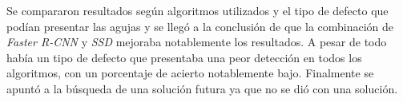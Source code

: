 Se compararon resultados según algoritmos utilizados y el tipo de defecto que podían presentar las agujas y se llegó a la conclusión de que la combinación de \emph{Faster R-CNN} y \emph{SSD} mejoraba notablemente los resultados. 
A pesar de todo había un tipo de defecto que presentaba una peor detección en todos los algoritmos, con un porcentaje de acierto notablemente bajo. Finalmente se apuntó a la búsqueda de una solución futura ya que no se dió con una solución.